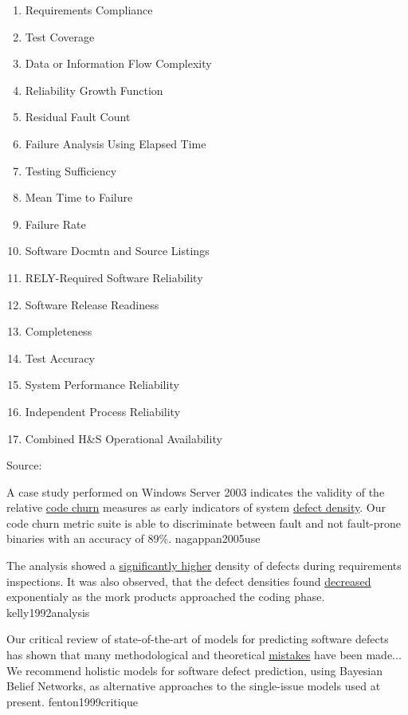 \documentclass{article}
\begin{document}
{\begin{pptWide}{3}
\begin{enumerate}
\item Requirements Compliance
\item Test Coverage
\item Data or Information Flow Complexity
\item Reliability Growth Function
\item Residual Fault Count
\item Failure Analysis Using Elapsed Time
\item Testing Sufficiency
\item Mean Time to Failure
\item Failure Rate
\item Software Docmtn and Source Listings
\item RELY-Required Software Reliability
\item Software Release Readiness
\item Completeness
\item Test Accuracy
\item System Performance Reliability
\item Independent Process Reliability
\item Combined H\&S Operational Availability
\end{enumerate}
\end{pptWide}
\par
{\scriptsize Source: \par}}

  {A case study performed on Windows Server 2003 indicates the validity of the relative \ul{code churn} measures as early indicators of system \ul{defect density}. Our code churn metric suite is able to discriminate between fault and not fault-prone binaries with an accuracy of 89\%.}
  {nagappan2005use}

  {The analysis showed a \ul{significantly higher} density of defects during requirements inspections. It was also observed, that the defect densities found \ul{decreased} exponentialy as the mork products approached the coding phase.}
  {kelly1992analysis}

  {Our critical review of state-of-the-art of models for predicting software defects has shown that many methodological and theoretical \ul{mistakes} have been made... We recommend holistic models for software defect prediction, using Bayesian Belief Networks, as alternative approaches to the single-issue models used at present.}
  {fenton1999critique}
\end{document}
